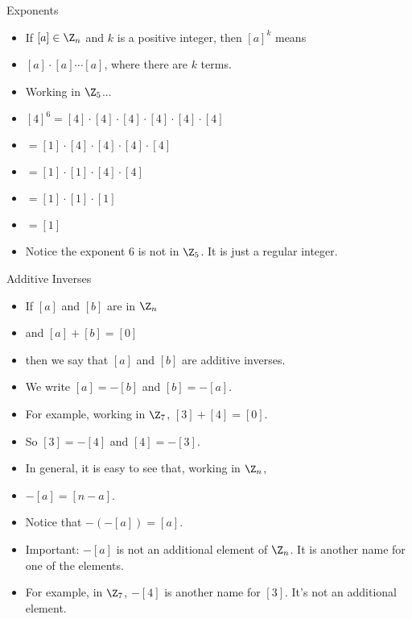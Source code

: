 \documentclass[handout]{beamer}
\begin{document}
\begin{frame}{Exponents}
\begin{itemize}
  \item If $[a]\in\Z_n$ and $k$ is a positive integer, then $[a]^k$ means
  \item $[a]\cdot[a]\cdots[a]$, where there are $k$ terms.
  \item Working in $\Z_5$...
  \item $[4]^6=[4]\cdot[4]\cdot[4]\cdot[4]\cdot[4]\cdot[4]$
  \item $=[1]\cdot[4]\cdot[4]\cdot[4]\cdot[4]$
  \item $=[1]\cdot[1]\cdot[4]\cdot[4]$
  \item $=[1]\cdot[1]\cdot[1]$
  \item $=[1]$
  \item Notice the exponent 6 is not in $\Z_5$. It is just a regular integer.
\end{itemize}
\end{frame}

\begin{frame}{Additive Inverses}
\begin{itemize}
  \item If $[a]$ and $[b]$ are in $\Z_n$
  \item and $[a]+[b] = [0]$
  \item then we say that $[a]$ and $[b]$ are additive inverses.
  \item We write $[a] = -[b]$ and $[b] = -[a]$.
  \item For example, working in $\Z_7$, $[3] + [4] = [0]$.
  \item So $[3] = -[4]$ and $[4] = -[3]$.
  \item In general, it is easy to see that, working in $\Z_n$,
  \item $-[a] = [n-a]$.
  \item Notice that $-(-[a]) = [a]$.
  \item Important: $-[a]$ is not an additional element of $\Z_n$. It is another name for one of the elements.
  \item For example, in $\Z_7$, $-[4]$ is another name for $[3]$. It's not an additional element.
\end{itemize}
\end{frame}
\end{document}
